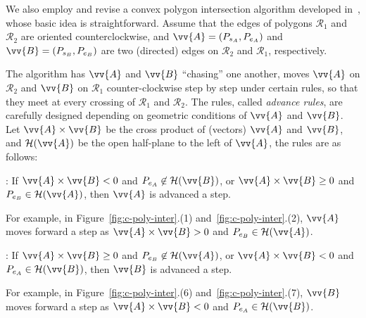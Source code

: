 We also employ and revise a convex polygon intersection algorithm developed in~\cite{ORourke:Intersection}, whose basic idea is straightforward.
Assume \kwlog that the edges of polygons $\mathcal{R}_1$ and $\mathcal{R}_2$ are oriented counterclockwise, and $\vv{A} = (P_{s_A}, P_{e_A})$ and $\vv{B} = (P_{s_B}, P_{e_B})$ are two (directed) edges on $\mathcal{R}_2$ and $\mathcal{R}_1$, respectively.


The algorithm has $\vv{A}$ and $\vv{B}$ ``chasing'' one another, \ie moves $\vv{A}$ on $\mathcal{R}_2$ and $\vv{B}$ on $\mathcal{R}_1$ counter-clockwise step by step under certain rules, so that they meet at every crossing of $\mathcal{R}_1$ and $\mathcal{R}_2$.
%
The rules, called \emph{advance rules}, are carefully designed depending on geometric conditions of $\vv{A}$ and $\vv{B}$.
Let $\vv{A} \times \vv{B}$ be the cross product of (vectors) $\vv{A}$ and $\vv{B}$, and $\mathcal{H}(\vv{A})$ be the open half-plane to the left of $\vv{A}$, the rules are as follows:

: If $\vv{A} \times \vv{B} < 0$ and $P_{e_A} \not \in \mathcal{H}(\vv{B})$, or $\vv{A} \times \vv{B} \ge 0$ and $P_{e_B} \in \mathcal{H}(\vv{A})$, then $\vv{A}$ is advanced a step.

For example, in Figure~\ref{fig:c-poly-inter}.(1) and~\ref{fig:c-poly-inter}.(2), $\vv{A}$ moves forward a step as  $\vv{A} \times \vv{B} > 0$ and $P_{e_B} \in \mathcal{H}(\vv{A})$.

: If $\vv{A} \times \vv{B} \ge 0$ and $P_{e_B} \not \in \mathcal{H}(\vv{A})$, or $\vv{A} \times \vv{B} < 0$ and $P_{e_A} \in \mathcal{H}(\vv{B})$, then  $\vv{B}$ is advanced a step.


For example, in Figure~\ref{fig:c-poly-inter}.(6) and~\ref{fig:c-poly-inter}.(7), $\vv{B}$ moves forward a step as $\vv{A} \times \vv{B} < 0$ and $P_{e_A} \in \mathcal{H}(\vv{B})$.



